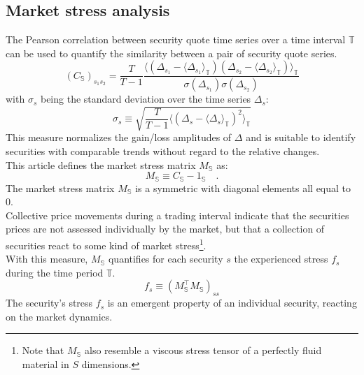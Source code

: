 \documentclass[11pt,twoside,a4paper]{article}
\begin{document}
\subsection{Market stress analysis}
The Pearson correlation between security quote time series over a time interval $\mathbb{T}$ can be used to quantify the similarity between a pair of security quote series.
\begin{equation}
\left(C_\mathbb{S}\right)_{s_1s_2}=\frac{T}{T-1}\frac{\langle\left(\Delta_{s_1}-\langle\Delta_{s_1}\rangle_\mathbb{T}\right)\left(\Delta_{s_2}-\langle\Delta_{s_2}\rangle_\mathbb{T}\right)\rangle_\mathbb{T}}{\sigma(\Delta_{s_1})\sigma(\Delta_{s_2})}
\end{equation}
with $\sigma_s$ being the standard deviation over the time series $\Delta_s$:
\begin{equation}
\sigma_s \equiv \sqrt{\frac{T}{T-1}\langle\left(\Delta_{s}-\langle\Delta_{s}\rangle_\mathbb{T}\right)^2\rangle_\mathbb{T}}
\end{equation}
This measure normalizes the gain/loss amplitudes of $\Delta$ and is suitable to identify securities with comparable trends without regard to the relative changes.\\
This article defines the market stress matrix $M_\mathbb{S}$ as:
\begin{equation}
M_\mathbb{S}\equiv C_\mathbb{S} - \textrm{1}_\mathbb{S}\quad.
\end{equation}
The market stress matrix $M_\mathbb{S}$ is a symmetric with diagonal elements all equal to $0$.\\
Collective price movements during a trading interval indicate that the securities prices are not assessed individually by the market, but that a collection of securities react to some kind of market stress\footnote{Note that $M_\mathbb{S}$ also resemble a viscous stress tensor of a perfectly fluid material in $S$ dimensions.}.\\
With this measure, $M_\mathbb{S}$ quantifies for each security $s$ the experienced stress $f_s$ during the time period $\mathbb{T}$.
\begin{equation}
f_s\equiv (M_\mathbb{S}^\top M_\mathbb{S})_{ss}
\end{equation}
The security's stress $f_s$ is an emergent property of an individual security, reacting on the market dynamics.\\
\end{document}
